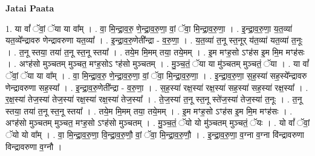 \documentclass[17pt]{extarticle}
\begin{document}
\textbf{Jatai Paata} \newline

1. या वां᳚ ॅवां॒ ॅया या वा᳚म् । . वा॒ मि॒न्द्रा॒व॒रु॒ णे॒न्द्रा॒व॒रु॒णा॒ वां॒ ॅवा॒ मि॒न्द्रा॒व॒रु॒णा॒ । . इ॒न्द्रा॒व॒रु॒णा॒ य॒त॒व्या॑ यत॒व्ये᳚न्द्रावरु णेन्द्रावरुणा यत॒व्या᳚ । . इ॒न्द्रा॒व॒रु॒णेती᳚न्द्रा - व॒रु॒णा॒ । . य॒त॒व्या॑ त॒नू स्त॒नूर् य॑त॒व्या॑ यत॒व्या॑ त॒नूः । . त॒नू स्तया॒ तया॑ त॒नू स्त॒नू स्तया᳚ । . तये॒म मि॒मम् तया॒ तये॒मम् । . इ॒म मꣳह॒सो ऽꣳह॑स इ॒म मि॒म मꣳह॑सः । . अꣳह॑सो मुञ्चतम् मुञ्चत॒ मꣳह॒सोऽ ꣳह॑सो मुञ्चतम् । . मु॒ञ्च॒तं॒ ॅया या मु॑ञ्चतम् मुञ्चतं॒ ॅया । . या वां᳚ ॅवां॒ ॅया या वा᳚म् । . वा॒ मि॒न्द्रा॒व॒रु॒ णे॒न्द्रा॒व॒रु॒णा॒ वां॒ ॅवा॒ मि॒न्द्रा॒व॒रु॒णा॒ । . इ॒न्द्रा॒व॒रु॒णा॒ स॒ह॒स्या॑ सह॒स्ये᳚न्द्रावरु णेन्द्रावरुणा सह॒स्या᳚ । . इ॒न्द्रा॒व॒रु॒णेती᳚न्द्रा - व॒रु॒णा॒ । . स॒ह॒स्या॑ रक्ष॒स्या॑ रक्ष॒स्या॑ सह॒स्या॑ सह॒स्या॑ रक्ष॒स्या᳚ । . र॒क्ष॒स्या॑ तेज॒स्या॑ तेज॒स्या॑ रक्ष॒स्या॑ रक्ष॒स्या॑ तेज॒स्या᳚ । . ते॒ज॒स्या॑ त॒नू स्त॒नू स्ते॑ज॒स्या॑ तेज॒स्या॑ त॒नूः । . त॒नू स्तया॒ तया॑ त॒नू स्त॒नू स्तया᳚ । . तये॒म मि॒मम् तया॒ तये॒मम् । . इ॒म मꣳह॒सो ऽꣳह॑स इ॒म मि॒म मꣳह॑सः । . अꣳह॑सो मुञ्चतम् मुञ्चत॒ मꣳह॒सो ऽꣳह॑सो मुञ्चतम् । . मु॒ञ्च॒तं॒ ॅयो यो मु॑ञ्चतम् मुञ्चतं॒ ॅयः । . यो वां᳚ ॅवां॒ ॅयो यो वा᳚म् । . वा॒ मि॒न्द्रा॒व॒रु॒णा॒ वि॒न्द्रा॒व॒रु॒णौ॒ वां॒ ॅवा॒ मि॒न्द्रा॒व॒रु॒णौ॒ । . इ॒न्द्रा॒व॒रु॒णा॒ व॒ग्ना व॒ग्ना वि॑न्द्रावरुणा विन्द्रावरुणा व॒ग्नौ । \newline
\end{document}
